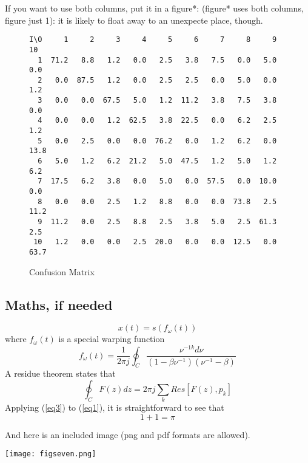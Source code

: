 \documentclass[10pt,a4paper,twocolumn]{article}
\begin{document}
If you want to use both columns, put it in a figure*:
(figure* uses both columns, figure just 1):
it is likely to float away to an unexpecte place, though.
\begin{figure*}[h]
  \centering
{\small
\begin{verbatim}
I\O     1     2     3     4     5     6     7     8     9    10
  1  71.2   8.8   1.2   0.0   2.5   3.8   7.5   0.0   5.0   0.0
  2   0.0  87.5   1.2   0.0   2.5   2.5   0.0   5.0   0.0   1.2
  3   0.0   0.0  67.5   5.0   1.2  11.2   3.8   7.5   3.8   0.0
  4   0.0   0.0   1.2  62.5   3.8  22.5   0.0   6.2   2.5   1.2
  5   0.0   2.5   0.0   0.0  76.2   0.0   1.2   6.2   0.0  13.8
  6   5.0   1.2   6.2  21.2   5.0  47.5   1.2   5.0   1.2   6.2
  7  17.5   6.2   3.8   0.0   5.0   0.0  57.5   0.0  10.0   0.0
  8   0.0   0.0   2.5   1.2   8.8   0.0   0.0  73.8   2.5  11.2
  9  11.2   0.0   2.5   8.8   2.5   3.8   5.0   2.5  61.3   2.5
 10   1.2   0.0   0.0   2.5  20.0   0.0   0.0  12.5   0.0  63.7
\end{verbatim}
}

  \caption{Confusion Matrix}
  
\end{figure*}

\subsection{Maths, if needed}

%
\begin{equation}
x(t) = s(f_\omega(t))
\label{eq1}
\end{equation}
where \(f_\omega(t)\) is a special warping function
\begin{equation}
f_\omega(t)=\frac{1}{2\pi j}\oint_C \frac{\nu^{-1k}d\nu}
{(1-\beta\nu^{-1})(\nu^{-1}-\beta)}
\label{eq2}
\end{equation}
A residue theorem states that
\begin{equation}
\oint_C F(z)dz=2 \pi j \sum_k Res[F(z),p_k]
\label{eq3}
\end{equation}
Applying (\ref{eq3}) to (\ref{eq1}), 
it is straightforward to see that
\begin{equation}
1 + 1 = \pi
\label{eq4}
\end{equation}

And here is an included image (png and pdf formats are allowed).

\begin{center}
  \texttt{[image: figseven.png]}
\end{center}
\end{document}
